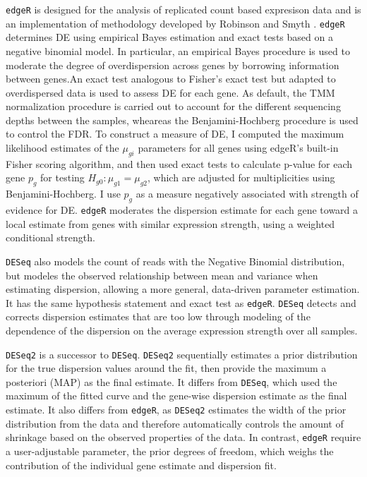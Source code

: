 {\tt edgeR} is designed for the analysis of replicated count based expresison data and is an implementation of methodology developed by Robinson and Smyth \citep{robinson2007moderated}. {\tt edgeR} determines DE using empirical Bayes estimation and exact tests based on a negative binomial model. In particular, an empirical Bayes procedure is used to moderate the degree of overdispersion across genes by borrowing information between genes.An exact test analogous to Fisher's exact test but adapted to overdispersed data is used to assess DE for each gene. As default, the TMM normalization procedure is carried out to account for the different sequencing depths between the samples, wheareas the Benjamini-Hochberg procedure is used to control the FDR\citep{seyednasrollah2013comparison}. To construct a measure of DE, I computed the maximum likelihood estimates of the $\mu_{gi}$ parameters for all genes using edgeR's built-in Fisher scoring algorithm, and then used exact tests to calculate p-value for each gene $p_g$ for testing $H_{g0}: \mu_{g1} = \mu_{g2}$, which are adjusted for multiplicities using Benjamini-Hochberg. I use $p_g$ as a measure negatively associated with strength of evidence for DE. {\tt edgeR} moderates the dispersion estimate for each gene toward a local estimate from genes with similar expression strength, using a weighted conditional strength.

{\tt DESeq} also models the count of reads with the Negative Binomial distribution, but modeles the observed relationship between mean and variance when estimating dispersion, allowing a more general, data-driven parameter estimation\citep{seyednasrollah2013comparison}. It has the same hypothesis statement and exact test as {\tt edgeR}. {\tt DESeq} detects and corrects dispersion estimates that are too low through modeling of the dependence of the dispersion on the average expression strength over all samples. 

{\tt DESeq2} is a successor to {\tt DESeq}. {\tt DESeq2} sequentially estimates a prior distribution for the true dispersion values around the fit, then provide the maximum a posteriori (MAP) as the final estimate. It differs from {\tt DESeq}, which used the maximum of the fitted curve and the gene-wise dispersion estimate as the final estimate. It also differs from {\tt edgeR}, as {\tt DESeq2} estimates the width of the prior distribution from the data and therefore automatically controls the amount of shrinkage based on the observed properties of the data. In contrast, {\tt edgeR} require a user-adjustable parameter, the prior degrees of freedom, which weighs the contribution of the individual gene estimate and dispersion fit\citep{love2014moderated}. 


